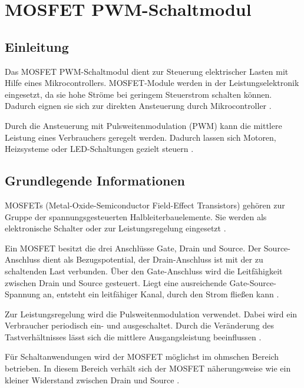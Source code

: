 %
%

\chapter{MOSFET PWM-Schaltmodul}

\section{Einleitung}

Das MOSFET PWM-Schaltmodul dient zur Steuerung elektrischer Lasten mit Hilfe eines Mikrocontrollers. 
MOSFET-Module werden in der Leistungselektronik eingesetzt, da sie hohe Ströme bei geringem Steuerstrom schalten können. Dadurch eignen sie sich zur direkten Ansteuerung durch Mikrocontroller \cite{Alles:2024}.

Durch die Ansteuerung mit Pulsweitenmodulation (PWM) kann die mittlere Leistung eines Verbrauchers geregelt werden. 
Dadurch lassen sich Motoren, Heizsysteme oder LED-Schaltungen gezielt steuern \cite{Tietze:2023}.

\section{Grundlegende Informationen}

MOSFETs (Metal-Oxide-Semiconductor Field-Effect Transistors) gehören zur Gruppe der spannungsgesteuerten Halbleiterbauelemente. 
Sie werden als elektronische Schalter oder zur Leistungsregelung eingesetzt \cite{Alles:2024}.

Ein MOSFET besitzt die drei Anschlüsse Gate, Drain und Source. 
Der Source-Anschluss dient als Bezugspotential, der Drain-Anschluss ist mit der zu schaltenden Last verbunden.
Über den Gate-Anschluss wird die Leitfähigkeit zwischen Drain und Source gesteuert. 
Liegt eine ausreichende Gate-Source-Spannung an, entsteht ein leitfähiger Kanal, durch den Strom fließen kann \cite{Tietze:2023}.

Zur Leistungsregelung wird die Pulsweitenmodulation verwendet. 
Dabei wird ein Verbraucher periodisch ein- und ausgeschaltet. 
Durch die Veränderung des Tastverhältnisses lässt sich die mittlere Ausgangsleistung beeinflussen \cite{Tietze:2023}.

Für Schaltanwendungen wird der MOSFET möglichst im ohmschen Bereich betrieben. 
In diesem Bereich verhält sich der MOSFET näherungsweise wie ein kleiner Widerstand zwischen Drain und Source \cite{Alles:2024}.

